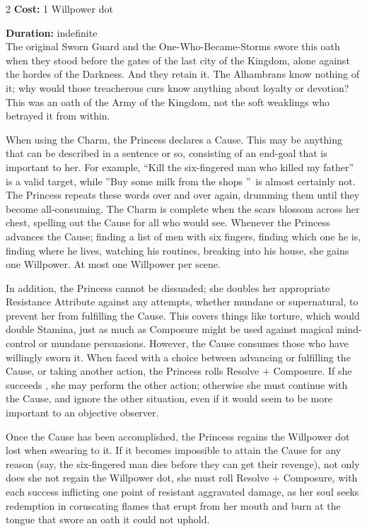 \begin{multicols}{2}
\noindent \textbf{Cost:} 1 Willpower dot

\noindent \textbf{Duration:} indefinite \\

\noindent The original Sworn Guard and the One-Who-Became-Storms swore this oath when they stood before the gates of the last city of the Kingdom, alone against the hordes of the Darkness. And they retain it. The Alhambrans know nothing of it; why would those treacherous curs know anything about loyalty or devotion? This was an oath of the Army of the Kingdom, not the soft weaklings who betrayed it from within. 

When using the Charm, the Princess declares a Cause. This may be anything that can be described in a sentence or so, consisting of an end-goal that is important to her. For example, \textquotedblleft Kill the six-fingered man who killed my father\textquotedblright\, is a valid target, while \textquotedblright Buy some milk from the shops \textquotedblright\, is almost certainly not. The Princess repeats these words over and over again, drumming them until they become all-consuming. The Charm is complete when the scars blossom across her chest, spelling out the Cause for all who would see. Whenever the Princess advances the Cause; finding a list of men with six fingers, finding which one he is, finding where he lives, watching his routines, breaking into his house, she gains one Willpower. At most one Willpower per scene. 

In addition, the Princess cannot be dissuaded; she doubles her appropriate Resistance Attribute against any attempts, whether mundane or supernatural, to prevent her from fulfilling the Cause. This covers things like torture, which would double Stamina, just as much as Composure might be used against magical mind-control or mundane persuasions. However, the Cause consumes those who have willingly sworn it. When faced with a choice between advancing or fulfilling the Cause, or taking another action, the Princess rolls Resolve + Composure. If she succeeds , she may perform the other action; otherwise she must continue with the Cause, and ignore the other situation, even if it would seem to be more important to an objective observer. 

Once the Cause has been accomplished, the Princess regains the Willpower dot lost when swearing to it. If it becomes impossible to attain the Cause for any reason (say, the six-fingered man dies before they can get their revenge), not only does she not regain the Willpower dot, she must roll Resolve + Composure, with each success inflicting one point of resistant aggravated damage, as her soul seeks redemption in coruscating flames that erupt from her mouth and burn at the tongue that swore an oath it could not uphold. 


\end{multicols}
